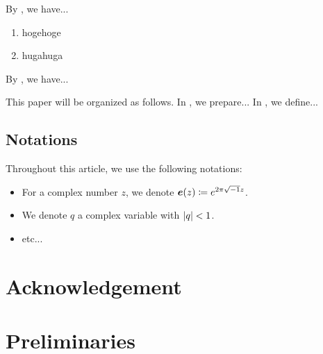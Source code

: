 \documentclass[11pt,a4paper,reqno,lualatex]{amsart} %
\numberwithin{equation}{section} %
\begin{document}
By  , we have...

\begin{lem} \label{lem:2}
	\begin{enumerate}
		\item \label{item:lem:2:hoge} hogehoge
		\item \label{item:lem:2:huga} hugahuga
	\end{enumerate}
\end{lem}

By  , we have...

\vspace{1em}

This paper will be organized as follows. 
In , we prepare...
In , we define...


\subsection*{Notations}


Throughout this article, we use the following notations:

\begin{itemize}
	\item For a complex number $ z $, we denote $ \bm{e}(z) \coloneqq e^{2\pi\sqrt{-1} z} $.
	\item We denote $ q $ a complex variable with $ \left\lvert q\right\rvert < 1 $.
	\item etc...
\end{itemize}



\section*{Acknowledgement} \label{sec:acknowledgement}




\section{Preliminaries} \label{sec:preliminaries}
\end{document}
